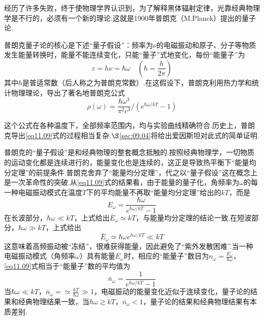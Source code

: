 经历了许多失败，终于使物理学界认识到，为了解释黑体辐射定律，光靠经典物理学是不行的，必须有一个新的理论.这就是1900年普朗克（M.Planck）提出的量子论.

普朗克量子论的核心是下述“量子假设”：频率为$\nu$的电磁振动和原子、分子等物质发生能量转换时，能量不能连续变化，只能“量子”式地变化，每份“能量子”为
\begin{equation}\label{eq11.08}
	\varepsilon=h\nu=\hbar\omega \quad(\hbar=\frac{h}{2\pi})
\end{equation}
其中$h$是普适常数（后人称之为普朗克常数）.在这假设下，普朗克利用热力学和统计物理理论，导出了著名地普朗克公式
\begin{equation}\label{eq11.09}
	\boxed{\rho(\omega)=\frac{\hbar\omega^{3}}{\pi^{2}c^{3}} \bigg/ (e^{\hbar\omega/kT}-1)}
\end{equation}

这个公式在各种温度下，全部频率范围内，均与实验曲线精确符合.历史上，普朗克导出\eqref{eq11.09}式的过程相当复杂.$\S$\ref{sec:09.04}将给出爱因斯坦对此式的简单证明.

普朗克的“量子假设”是和经典物理的整套概念抵触的.按照经典物理学，一切物质的运动变化都是连续进行的，能量变化也是连续的，这正是导致热平衡下“能量均分定理”的前提条件.普朗克舍弃了“能量均分定理”，代之以“量子假设”这在概念上是一次革命性的突破.从\eqref{eq11.09}式的结果看，由于能量的量子化，角频率为$\omega$的每一种电磁振动模式在温度$T$下的平均能量不再取“能量均分定理”给出的$kT$，而是
\begin{equation*}
	 E_{\omega}=\frac{\hbar\omega}{e^{\hbar\omega/kT}-1} 
\end{equation*}
在长波部分，$\hbar\omega\ll kT$，上式给出$\bar{E}_{\omega}\simeq kT$，与能量均分定理的结论一致.在短波部分，$\hbar\omega\gg kT$，上式给出
\begin{equation*}
	 \bar{E}_{\omega}\simeq \hbar\omega e^{\hbar\omega/kT} \ll kT 
\end{equation*}
这意味着高频振动被“冻结”，很难获得能量，因此避免了“紫外发散困难”.当一种电磁振动模式（角频率$\omega$）具有能量$E_{\omega}$时，相应的“能量子”数目为$n_{\omega}=\frac{E_{\omega}}{\hbar\omega}$，\eqref{eq11.09}式相当于“能量子”数的平均值为
\eqshort
\begin{equation}\label{eq11.10}
	\bar{n}_{\omega}=\frac{1}{e^{\hbar\omega/kT}-1}
\end{equation}
当$\hbar\omega\ll kT$，$\bar{n}_{\omega}=\simeq\frac{kT}{\hbar\omega}\gg 1$，电磁振动的能量变化近似于连续变化，量子论的结果和经典物理结果一致，当$\hbar\omega\gtrsim kT$，$\bar{n}_{\omega}<1$，量子论的结果和经典物理结果有本质差别.

